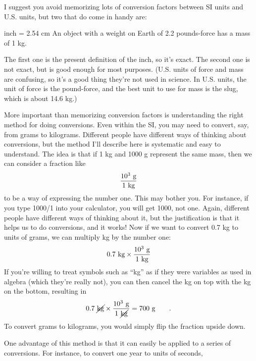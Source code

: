 I suggest you avoid memorizing lots of conversion factors
between SI units and U.S. units, but two that do come in handy are:

\begin{indentedblock}
 inch =  2.54 cm
\indent An object with a weight on Earth of 2.2 pounds-force has a mass of 1 kg.
\end{indentedblock}

The first one is the present definition of the inch, so it's exact. The second one is not exact, but is good enough for most purposes. (U.S. units of force and mass are confusing, so it's a good thing they're not used in science. In U.S. units, the unit of force is the pound-force, and the best unit to use for mass is the slug, which is about 14.6 kg.)

More important than memorizing conversion factors is
understanding the right method for doing conversions. Even
within the SI, you may need to convert, say, from grams to
kilograms. Different people have different ways of thinking
about conversions, but the method I'll describe here is
systematic and easy to understand. The idea is that if 1 kg
and 1000 g represent the same mass, then we can consider a fraction like
\begin{equation*}
  \frac{10^3\ \gunit}{1\ \kgunit}
\end{equation*}
to be a way of expressing the number one. This may bother
you. For instance, if you type 1000/1 into your calculator,
you will get 1000, not one. Again, different people have
different ways of thinking about it, but the justification
is that it helps us to do conversions, and it works! Now if
we want to convert 0.7 kg to units of grams, we can multiply
kg by the number one:
\begin{equation*}
  0.7\ \kgunit \times \frac{10^3\ \gunit}{1\ \kgunit}
\end{equation*}
If you're willing to treat symbols such as ``kg'' as if they
were variables as used in algebra (which they're really
not), you can then cancel the kg on top with the kg on the
bottom, resulting in
\begin{equation*}
  0.7\ \cancel{\kgunit} \times \frac{10^3\ \gunit}{1\ \cancel{\kgunit}}  = 700\ \gunit   \qquad   .
\end{equation*}
To convert grams to kilograms, you would simply flip the
fraction upside down.

One advantage of this method is that it can easily be
applied to a series of conversions. For instance, to convert
one year to units of seconds,

